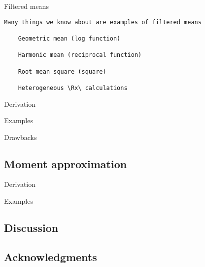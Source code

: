 Filtered means

\begin{verbatim}
Many things we know about are examples of filtered means

    Geometric mean (log function)

    Harmonic mean (reciprocal function)

    Root mean square (square) 

    Heterogeneous \Rx\ calculations
\end{verbatim}

Derivation

Examples

Drawbacks

\subsection{Moment approximation}\label{moment-approximation}

Derivation

Examples

\subsection{Discussion}\label{discussion}

\subsection{Acknowledgments}\label{acknowledgments}

\printbibliography

